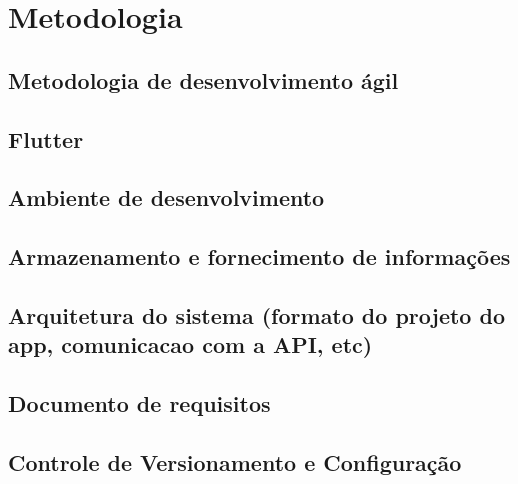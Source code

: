 \chapter{Metodologia}

\section{Metodologia de desenvolvimento ágil}
\lipsum[1-2]

\section{Flutter}
\lipsum[1-2]

\section{Ambiente de desenvolvimento}
\lipsum[1-2]

\section{Armazenamento e fornecimento de informações}
\lipsum[1-2]

\section{Arquitetura do sistema (formato do projeto do app, comunicacao com a API, etc)}
\lipsum[1-2]

\section{Documento de requisitos}
\lipsum[1-2]

\section{Controle de Versionamento e Configuração}
\lipsum[1-2]

